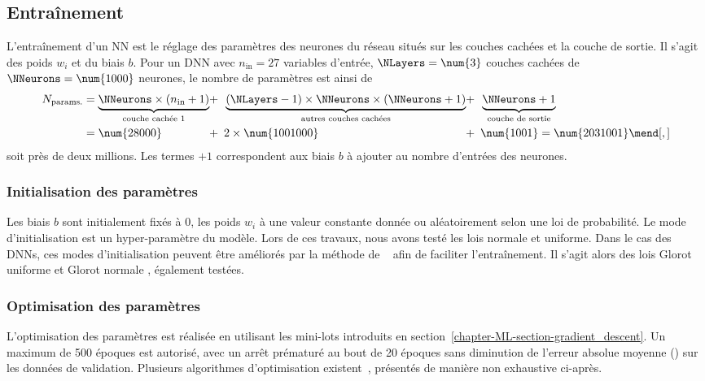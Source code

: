 \subsection{Entraînement}\label{chapter-ML-section-DNN-training}
L'entraînement d'un NN est le réglage des paramètres des neurones du réseau situés sur les couches cachées et la couche de sortie.
Il s'agit des poids $w_i$ et du biais $b$.
Pour un DNN avec
$n_\text{in} = \num{27}$ variables d'entrée,
$\NLayers = \num{3}$ couches cachées
de $\NNeurons = \num{1000}$ neurones,
le nombre de paramètres est ainsi de
\begin{align}
N_\text{params.}
&= \underbrace{\NNeurons \times (n_\text{in} + 1)}_\text{couche cachée 1} \!\!\!&\!\!\!+\,\,\,& \underbrace{(\NLayers -1)\times \NNeurons \times(\NNeurons+1)}_\text{autres couches cachées} \!\!\!&\!\!\!+\,\,\,& \underbrace{\NNeurons +1\vphantom{()}}_\text{couche de sortie}
\nonumber\\&
=
\num{28000} \!\!\!&\!\!\!+\,\,\,& 2\times\num{1001000} \!\!\!&\!\!\!+\,\,\,& \num{1001}
=
\num{2031001}
\mend[,]
\end{align}
soit près de deux millions.
Les termes \og $+1$ \fg{} correspondent aux biais $b$ à ajouter au nombre d'entrées des neurones.
\subsubsection{Initialisation des paramètres}
Les biais $b$ sont initialement fixés à 0,
les poids $w_i$ à une valeur constante donnée ou aléatoirement selon une loi de probabilité.
Le mode d'initialisation est un hyper-paramètre du modèle.
Lors de ces travaux, nous avons testé les lois normale et uniforme.
Dans le cas des DNNs, ces modes d'initialisation peuvent être améliorés par la méthode de \citeauthor{glorot}~\cite{glorot} afin de faciliter l'entraînement.
Il s'agit alors des lois \og Glorot uniforme \fg{} et \og Glorot normale \fg, également testées.
\subsubsection{Optimisation des paramètres}\label{chapter-ML-section-DNN-training-optimizers}
L'optimisation des paramètres est réalisée
en utilisant les mini-lots introduits en section~\ref{chapter-ML-section-gradient_descent}.
Un maximum de \num{500} époques est autorisé,
avec un arrêt prématuré au bout de \num{20} époques sans diminution de l'erreur absolue moyenne (\LossMAE) sur les données de validation.
Plusieurs algorithmes d'optimisation existent~\cite{DNN}, présentés de manière non exhaustive ci-après.
